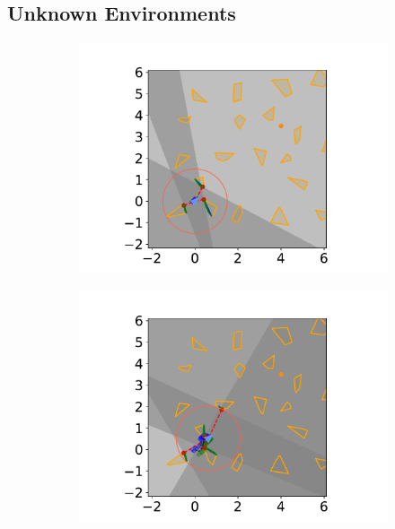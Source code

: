 \subsection{Unknown Environments}
\begin{figure}[h]
    \centering
    \begin{subfigure}{0.20\textwidth}
        \centering
        \includegraphics[width=\textwidth]{../figures/Simulations/sim2unkenv/frame_0.pdf}
    \end{subfigure}%
    \hfill
    \begin{subfigure}{0.20\textwidth}
        \centering
        \includegraphics[width=\textwidth]{../figures/Simulations/sim2unkenv/frame_1.pdf}
    \end{subfigure}%

\end{figure}

